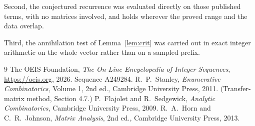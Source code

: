 \documentclass[11pt,a4paper]{article}
\theoremstyle{plain}
\theoremstyle{definition}
\begin{document}
Second, the conjectured recurrence was evaluated directly on those published terms, with no
matrices involved, and holds wherever the proved range and the data overlap.

Third, the annihilation test of Lemma~\ref{lem:crit} was carried out in exact integer
arithmetic on the whole vector rather than on a sampled prefix.

\begin{thebibliography}{9}
 The OEIS Foundation, \emph{The On-Line Encyclopedia of Integer
Sequences}, \url{https://oeis.org}, 2026. Sequence A249284.
 R.~P.~Stanley, \emph{Enumerative Combinatorics}, Volume 1, 2nd ed.,
Cambridge University Press, 2011. (Transfer-matrix method, Section 4.7.)
 P.~Flajolet and R.~Sedgewick, \emph{Analytic Combinatorics}, Cambridge
University Press, 2009.
 R.~A.~Horn and C.~R.~Johnson, \emph{Matrix Analysis}, 2nd ed., Cambridge
University Press, 2013.
\end{thebibliography}
\end{document}
